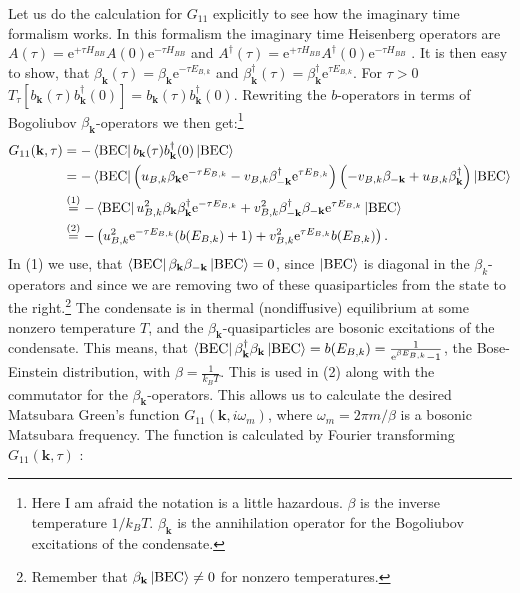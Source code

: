 Let us do the calculation for $G_{11}$ explicitly to see how the imaginary time formalism works. In this formalism the imaginary time Heisenberg operators are $A(\tau) = \text{e}^{+\tau H_{BB}}A(0)\text{e}^{-\tau H_{BB}}$ and $A^\dagger(\tau) = \text{e}^{+\tau H_{BB}}A^\dagger(0)\text{e}^{-\tau H_{BB}}$ \cite[p. 185]{BruusFlensberg}. It is then easy to show, that $\beta_\mathbf{k}(\tau) = \beta_\mathbf{k}\text{e}^{-\tau E_{B,k}}$ and $\beta^\dagger_\mathbf{k}(\tau) = \beta^\dagger_\mathbf{k}\text{e}^{\tau E_{B,k}}$. For $\tau > 0$ $T_{\tau}[b_\mathbf{k}(\tau)b_\mathbf{k}^\dagger(0)] = b_\mathbf{k}(\tau)b_\mathbf{k}^\dagger(0)$. Rewriting the $b$-operators in terms of Bogoliubov $\beta_\mathbf{k}$-operators we then get:\footnote{Here I am afraid the notation is a little hazardous. $\beta$ is the inverse temperature $1/k_BT$. $\beta_\mathbf{k}$ is the annihilation operator for the Bogoliubov excitations of the condensate.}
\begin{align}
G_{11}(\mathbf{k},\tau) &= -\bra{\text{BEC}} b_\mathbf{k}(\tau)b_\mathbf{k}^\dagger(0)\ket{\text{BEC}} \nonumber \\
&= -\bra{\text{BEC}} \left(u_{B,k}\beta_\mathbf{k}\text{e}^{-\tau E_{B,k}} - v_{B,k} \beta^\dagger_{-\mathbf{k}}\text{e}^{\tau E_{B,k}} \right)\left( -v_{B,k}\beta_{-\mathbf{k}} + u_{B,k} \beta^\dagger_{\mathbf{k}} \right)\ket{\text{BEC}} \nonumber \\
&\overset{(1)}{=} -\bra{\text{BEC}} u_{B,k}^2\beta_\mathbf{k}\beta^\dagger_\mathbf{k}\text{e}^{-\tau E_{B,k}} + v_{B,k}^2 \beta^\dagger_{-\mathbf{k}}\beta_{-\mathbf{k}}\text{e}^{\tau E_{B,k}} \ket{\text{BEC}} \nonumber \\
&\overset{(2)}{=} -\left(u_{B,k}^2 \text{e}^{-\tau E_{B,k}}(b(E_{B,k})+1)+ v_{B,k}^2\text{e}^{\tau E_{B,k}}b(E_{B,k})\right). \nonumber
\end{align}
In (1) we use, that $\bra{\text{BEC}}\beta_\mathbf{k}\beta_{-\mathbf{k}}\ket{\text{BEC}} = 0$, since $\ket{\text{BEC}}$ is diagonal in the $\beta_k$-operators and since we are removing two of these quasiparticles from the state to the right.\footnote{Remember that $\beta_\mathbf{k}\ket{\text{BEC}} \neq 0$ for nonzero temperatures.} The condensate is in thermal (nondiffusive) equilibrium at some nonzero temperature $T$, and the $\beta_\mathbf{k}$-quasiparticles are bosonic excitations of the condensate. This means, that $\bra{\text{BEC}}\beta_\mathbf{k}^\dagger\beta_{\mathbf{k}}\ket{\text{BEC}} = b(E_{B,k}) = \frac{1}{\text{e}^{\beta E_{B,k}}-1}$, the Bose-Einstein distribution, with $\beta = \frac{1}{k_BT}$. This is used in (2) along with the commutator for the $\beta_\mathbf{k}$-operators. This allows us to calculate the desired Matsubara Green's function $G_{11}(\mathbf{k},i\omega_m)$, where $\omega_m = 2\pi m/\beta$ is a bosonic Matsubara frequency. The function is calculated by Fourier transforming $G_{11}(\mathbf{k},\tau)$ \cite[p. 187-189]{BruusFlensberg}: 
